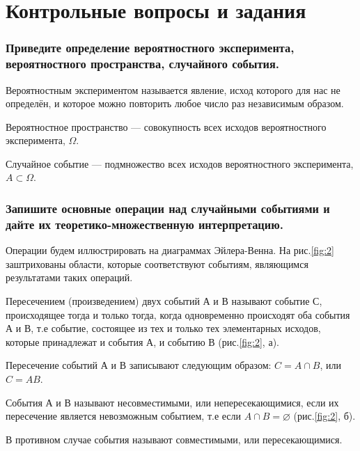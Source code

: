 \documentclass{book}
\begin{document}
\section*{Контрольные вопросы и задания}

\subsubsection*{Приведите определение вероятностного эксперимента, вероятностного пространства, случайного события.}

Вероятностным экспериментом называется явление, исход которого для нас не определён, и которое можно повторить любое число раз независимым образом.

Вероятностное пространство --- совокупность всех исходов вероятностного эксперимента, $ \Omega $.

Случайное событие --- подмножество всех исходов вероятностного эксперимента, $ A \subset \Omega $.

\subsubsection*{Запишите основные операции над случайными событиями и дайте их теоретико-множественную интерпретацию.}

Операции будем иллюстрировать на диаграммах Эйлера-Венна.
На рис.\ref{fig:2} заштрихованы области, которые соответствуют событиям, являющимся результатами таких операций.

Пересечением (произведением) двух событий А и В называют событие С, происходящее тогда и только тогда,
когда одновременно происходят оба события А и В, т.е событие,
состоящее из тех и только тех элементарных исходов, которые принадлежат и события А, и событию В (рис.\ref{fig:2}, а).

Пересечение событий А и В записывают следующим образом: $ C = A \cap B $, или $ C = AB $.

События А и В называют несовместимыми, или непересекающимися, если их пересечение является невозможным событием, т.е если $ A \cap B = \varnothing$ (рис.\ref{fig:2}, б).

В противном случае события называют совместимыми, или пересекающимися.
\end{document}
